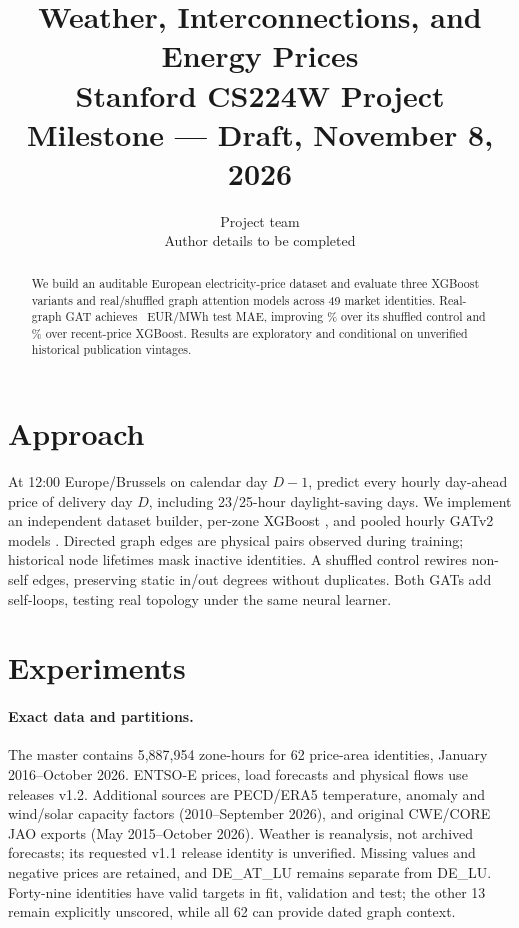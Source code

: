 \documentclass{article}
\title{Weather, Interconnections, and Energy Prices\\
  \small\normalfont Stanford CS224W Project Milestone --- Draft, November 8, 2026}
\author{Project team\\\small Author details to be completed}
\begin{document}
\maketitle
\begin{abstract}
\ifdefined\ControlledStudyComplete
\ControlledAbstract
\else
We build an auditable European electricity-price dataset and evaluate three
XGBoost variants and real/shuffled graph attention models across 49 market
identities. Real-graph GAT achieves \SuiteGraphTest\ EUR/MWh test MAE, improving
\SuiteShuffleGain\% over its shuffled control and \SuiteXgbGain\% over recent-price
XGBoost. Results are exploratory and conditional on unverified historical
publication vintages.
\fi
\end{abstract}

\section{Approach}
At 12:00 Europe/Brussels on calendar day $D-1$, predict every hourly day-ahead
price of delivery day $D$, including 23/25-hour daylight-saving days. We implement
an independent dataset builder, per-zone XGBoost \cite{chen}, and pooled hourly
GATv2 models \cite{gat}. Directed graph edges are physical pairs observed during
training; historical node lifetimes mask inactive identities. A shuffled control
rewires non-self edges, preserving static in/out degrees without duplicates.
Both GATs add self-loops, testing real topology under the same neural learner.

\section{Experiments}
\paragraph{Exact data and partitions.}
The master contains 5,887,954 zone-hours for 62 price-area identities, January
2016--October 2026. ENTSO-E prices, load forecasts and physical flows use releases
v1.2. Additional sources are PECD/ERA5 temperature, anomaly and wind/solar capacity
factors (2010--September 2026), and original CWE/CORE JAO exports
(May 2015--October 2026). Weather is reanalysis, not archived forecasts; its
requested v1.1 release identity is unverified. Missing values and negative prices
are retained, and DE\_AT\_LU remains separate from DE\_LU. Forty-nine identities
have valid targets in fit, validation and test; the other 13 remain explicitly
unscored, while all 62 can provide dated graph context.
\end{document}
